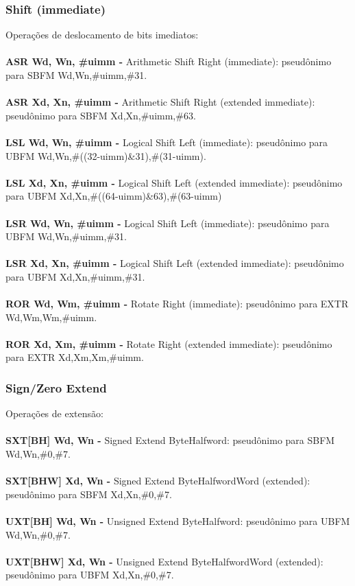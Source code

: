 \documentclass[12pt,a4paper,utf8]{ppgsi}
\begin{document}
\subsubsection{Shift (immediate)}
Operações de deslocamento de bits imediatos:
\\\\\textbf{ASR Wd, Wn, \#uimm -} Arithmetic Shift Right (immediate): pseudônimo para SBFM Wd,Wn,\#uimm,\#31. 
\\\\\textbf{ASR Xd, Xn, \#uimm -} Arithmetic Shift Right (extended immediate): pseudônimo para SBFM Xd,Xn,\#uimm,\#63. 
\\\\\textbf{LSL Wd, Wn, \#uimm -} Logical Shift Left (immediate): pseudônimo para UBFM Wd,Wn,\#((32-uimm)\&31),\#(31-uimm). 
\\\\\textbf{LSL Xd, Xn, \#uimm -} Logical Shift Left (extended immediate): pseudônimo para UBFM Xd,Xn,\#((64-uimm)\&63),\#(63-uimm) 
\\\\\textbf{LSR Wd, Wn, \#uimm -} Logical Shift Left (immediate): pseudônimo para UBFM Wd,Wn,\#uimm,\#31. 
\\\\\textbf{LSR Xd, Xn, \#uimm -} Logical Shift Left (extended immediate): pseudônimo para UBFM Xd,Xn,\#uimm,\#31. 
\\\\\textbf{ROR Wd, Wm, \#uimm -} Rotate Right (immediate): pseudônimo para EXTR Wd,Wm,Wm,\#uimm.  
\\\\\textbf{ROR Xd, Xm, \#uimm -} Rotate Right (extended immediate): pseudônimo para EXTR Xd,Xm,Xm,\#uimm. 


\subsubsection{Sign/Zero Extend}
Operações de extensão:
\\\\\textbf{SXT[BH] Wd, Wn -} Signed Extend Byte\textbar Halfword: pseudônimo para SBFM Wd,Wn,\#0,\#7. 
\\\\\textbf{SXT[BHW] Xd, Wn -} Signed Extend Byte\textbar Halfword\textbar Word (extended): pseudônimo para SBFM Xd,Xn,\#0,\#7. 
\\\\\textbf{UXT[BH] Wd, Wn -} Unsigned Extend Byte\textbar Halfword: pseudônimo para UBFM Wd,Wn,\#0,\#7. 
\\\\\textbf{UXT[BHW] Xd, Wn -} Unsigned Extend Byte\textbar Halfword\textbar Word (extended): pseudônimo para UBFM Xd,Xn,\#0,\#7. 
\end{document}
